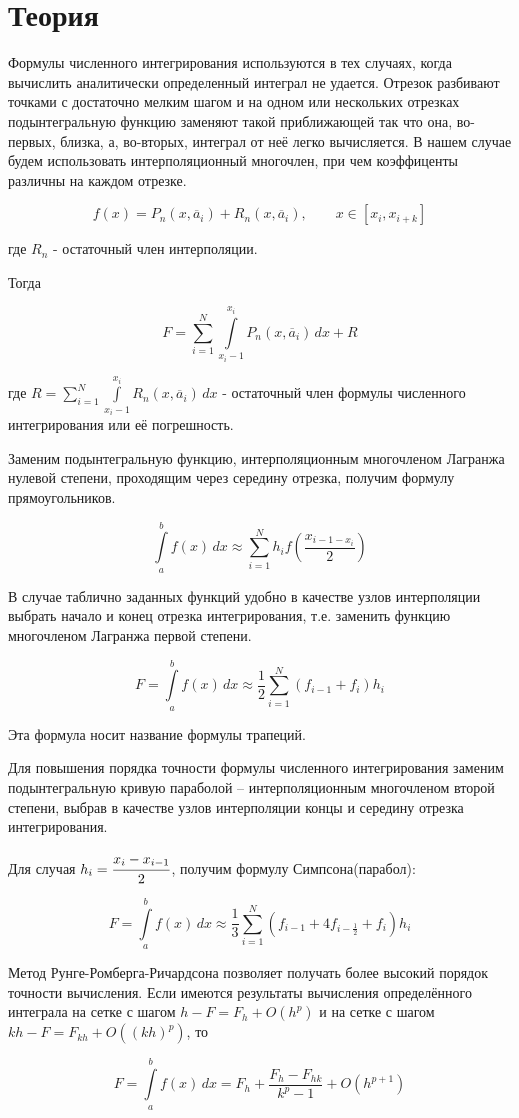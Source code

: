 \section*{Теория}

Формулы численного интегрирования используются в тех случаях, когда вычислить
аналитически определенный интеграл не удается. Отрезок разбивают точками с
достаточно мелким шагом и на одном или нескольких отрезках подынтегральную
функцию заменяют такой приближающей так что она, во-первых, близка, а, во-вторых,
интеграл от неё легко вычисляется. В нашем случае будем использовать
интерполяционный многочлен, при чем коэффиценты различны на каждом отрезке.

$$f(x) = P_n(x, \overline{a}_i) + R_n(x, \overline{a}_i),
\qquad x \in [x_i,x_{i+k}]$$

где $R_n$ - остаточный член интерполяции.

Тогда

$$F = \sum_{i=1}^{N}\int\limits_{x_i-1}^{x_i}P_n(x, \overline{a}_i)\,dx + R$$

где $R = \sum_{i=1}^{N}\int\limits_{x_i-1}^{x_i}R_n(x, \overline{a}_i)\,dx$ -
остаточный член формулы численного интегрирования или её погрешность. 

Заменим подынтегральную функцию, интерполяционным многочленом Лагранжа
нулевой степени, проходящим через середину отрезка, получим формулу
прямоугольников.

$$\int\limits_a^b f(x)\,dx \approx
\sum_{i=1}^N h_i f\left(\frac{x_{i-1 - x_i}}{2}\right)$$

В случае таблично заданных функций удобно в качестве узлов интерполяции выбрать
начало и конец отрезка интегрирования, т.е. заменить функцию многочленом Лагранжа
первой степени.

$$F = \int\limits_a^b f(x)\,dx \approx
\frac{1}{2}\sum_{i=1}^N (f_{i-1} + f_i)h_i$$

Эта формула носит название формулы трапеций.

Для повышения порядка точности формулы численного интегрирования заменим
подынтегральную кривую параболой – интерполяционным многочленом второй
степени, выбрав в качестве узлов интерполяции концы и середину отрезка
интегрирования.

Для случая $h_i = \cfrac{x_i - x_{i-1}}{2}$, получим формулу Симпсона(парабол):

$$F = \int\limits_a^b f(x)\,dx \approx
\frac{1}{3}\sum_{i=1}^N (f_{i-1} + 4f_{i-\frac{1}{2}} + f_i)h_i$$

Метод Рунге-Ромберга-Ричардсона позволяет получать более высокий порядок
точности вычисления. Если имеются результаты вычисления определённого
интеграла на сетке с шагом $h - F = F_h +O(h^p)$ и на сетке
с шагом $kh - F = F_{kh} +O((kh)^p)$, то

$$F = \int\limits_a^b f(x)\,dx =
F_h + \frac{F_h - F_{hk}}{k^p - 1} + O(h^{p+1})
$$
\pagebreak